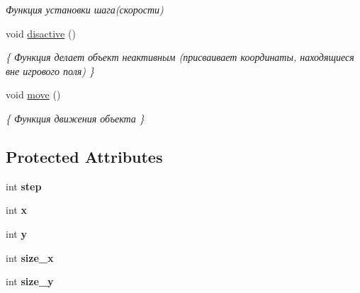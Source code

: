 \begin{DoxyCompactItemize}
\begin{DoxyCompactList}\small\item\em Функция установки шага(скорости) \end{DoxyCompactList}\item 
\mbox{\label{classbase__object_a87c6fdcdcca46c1839d0bf7fae110574}} 
void \mbox{\hyperlink{classbase__object_a87c6fdcdcca46c1839d0bf7fae110574}{disactive}} ()
\begin{DoxyCompactList}\small\item\em \{ Функция делает объект неактивным (присваивает координаты, находящиеся вне игрового поля) \} \end{DoxyCompactList}\item 
\mbox{\label{classbase__object_ae472a40a19f6419fca4aa35c91d48542}} 
void \mbox{\hyperlink{classbase__object_ae472a40a19f6419fca4aa35c91d48542}{move}} ()
\begin{DoxyCompactList}\small\item\em \{ Функция движения объекта \} \end{DoxyCompactList}\end{DoxyCompactItemize}
\subsection*{Protected Attributes}
\begin{DoxyCompactItemize}
\item 
\mbox{\label{classbase__object_a36f88ce36cd068418e1118768a2141b3}} 
int {\bfseries step}
\item 
\mbox{\label{classbase__object_a9e2761b4dfa644652ea475618533ff83}} 
int {\bfseries x}
\item 
\mbox{\label{classbase__object_ab9e8870a1b0d42c556c69ab9a564a4cf}} 
int {\bfseries y}
\item 
\mbox{\label{classbase__object_a554c6a9d999cf59daed4a5abdef14395}} 
int {\bfseries size\+\_\+x}
\item 
\mbox{\label{classbase__object_a481776fb475d298bf7e9012568f16a2e}} 
int {\bfseries size\+\_\+y}
\end{DoxyCompactItemize}
